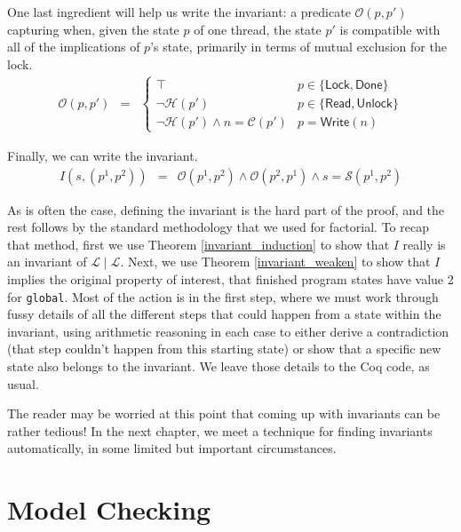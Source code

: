 \documentclass{amsbook}
\theoremstyle{definition}
\theoremstyle{remark}
\numberwithin{section}{chapter}
\numberwithin{equation}{chapter}
\begin{document}
One last ingredient will help us write the invariant: a predicate $\mathcal O(p, p')$ capturing when, given the state $p$ of one thread, the state $p'$ is compatible with all of the implications of $p$'s state, primarily in terms of mutual exclusion for the lock.
\begin{eqnarray*}
  \mathcal O(p, p') &=& \begin{cases}
    \top & p \in \{\mathsf{Lock}, \mathsf{Done}\} \\
    \neg \mathcal H(p') & p \in \{\mathsf{Read}, \mathsf{Unlock}\} \\
    \neg \mathcal H(p') \land n = \mathcal C(p') & p = \mathsf{Write}(n)
  \end{cases}
\end{eqnarray*}

Finally, we can write the invariant.
\invariants
\begin{eqnarray*}
  I(s, (p^1, p^2)) &=& \mathcal O(p^1, p^2) \land \mathcal O(p^2, p^1) \land s = \mathcal S(p^1, p^2)
\end{eqnarray*}

As is often the case, defining the invariant is the hard part of the proof, and the rest follows by the standard methodology that we used for factorial.
To recap that method, first we use Theorem \ref{invariant_induction} to show that $I$ really is an invariant of $\mathcal L \mid \mathcal L$.
Next, we use Theorem \ref{invariant_weaken} to show that $I$ implies the original property of interest, that finished program states have value 2 for \texttt{global}.
Most of the action is in the first step, where we must work through fussy details of all the different steps that could happen from a state within the invariant, using arithmetic reasoning in each case to either derive a contradiction (that step couldn't happen from this starting state) or show that a specific new state also belongs to the invariant.
We leave those details to the Coq code, as usual.

The reader may be worried at this point that coming up with invariants can be rather tedious!
In the next chapter, we meet a technique for finding invariants automatically, in some limited but important circumstances.



\chapter{\label{model_checking}Model Checking}
\end{document}
